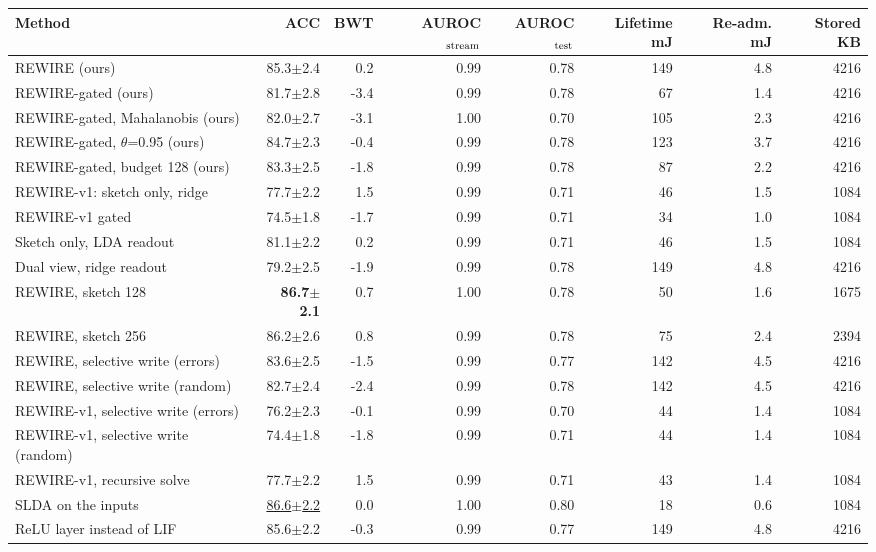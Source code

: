 \begin{tabular}{lrrrrrrr}
\toprule
Method & ACC & BWT & AUROC$_{\rm stream}$ & AUROC$_{\rm test}$ & Lifetime mJ & Re-adm. mJ & Stored KB \\
\midrule
REWIRE (ours) & 85.3{\tiny$\pm$2.4} & 0.2 & 0.99 & 0.78 & 149 & 4.8 & 4216 \\
REWIRE-gated (ours) & 81.7{\tiny$\pm$2.8} & -3.4 & 0.99 & 0.78 & 67 & 1.4 & 4216 \\
REWIRE-gated, Mahalanobis (ours) & 82.0{\tiny$\pm$2.7} & -3.1 & 1.00 & 0.70 & 105 & 2.3 & 4216 \\
REWIRE-gated, $\theta$=0.95 (ours) & 84.7{\tiny$\pm$2.3} & -0.4 & 0.99 & 0.78 & 123 & 3.7 & 4216 \\
REWIRE-gated, budget 128 (ours) & 83.3{\tiny$\pm$2.5} & -1.8 & 0.99 & 0.78 & 87 & 2.2 & 4216 \\
REWIRE-v1: sketch only, ridge & 77.7{\tiny$\pm$2.2} & 1.5 & 0.99 & 0.71 & 46 & 1.5 & 1084 \\
REWIRE-v1 gated & 74.5{\tiny$\pm$1.8} & -1.7 & 0.99 & 0.71 & 34 & 1.0 & 1084 \\
Sketch only, LDA readout & 81.1{\tiny$\pm$2.2} & 0.2 & 0.99 & 0.71 & 46 & 1.5 & 1084 \\
Dual view, ridge readout & 79.2{\tiny$\pm$2.5} & -1.9 & 0.99 & 0.78 & 149 & 4.8 & 4216 \\
REWIRE, sketch 128 & \textbf{86.7{\tiny$\pm$2.1}} & 0.7 & 1.00 & 0.78 & 50 & 1.6 & 1675 \\
REWIRE, sketch 256 & 86.2{\tiny$\pm$2.6} & 0.8 & 0.99 & 0.78 & 75 & 2.4 & 2394 \\
REWIRE, selective write (errors) & 83.6{\tiny$\pm$2.5} & -1.5 & 0.99 & 0.77 & 142 & 4.5 & 4216 \\
REWIRE, selective write (random) & 82.7{\tiny$\pm$2.4} & -2.4 & 0.99 & 0.78 & 142 & 4.5 & 4216 \\
REWIRE-v1, selective write (errors) & 76.2{\tiny$\pm$2.3} & -0.1 & 0.99 & 0.70 & 44 & 1.4 & 1084 \\
REWIRE-v1, selective write (random) & 74.4{\tiny$\pm$1.8} & -1.8 & 0.99 & 0.71 & 44 & 1.4 & 1084 \\
REWIRE-v1, recursive solve & 77.7{\tiny$\pm$2.2} & 1.5 & 0.99 & 0.71 & 43 & 1.4 & 1084 \\
SLDA on the inputs & \underline{86.6{\tiny$\pm$2.2}} & 0.0 & 1.00 & 0.80 & 18 & 0.6 & 1084 \\
ReLU layer instead of LIF & 85.6{\tiny$\pm$2.2} & -0.3 & 0.99 & 0.77 & 149 & 4.8 & 4216 \\

\end{tabular}
